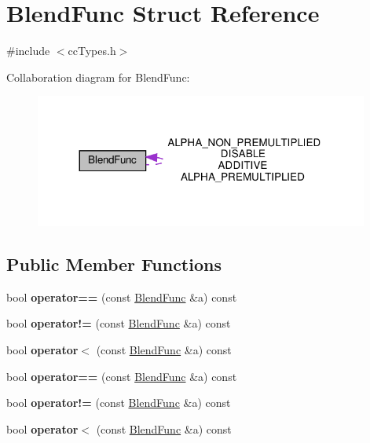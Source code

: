 \hypertarget{structBlendFunc}{}\section{Blend\+Func Struct Reference}
\label{structBlendFunc}


{\ttfamily \#include $<$cc\+Types.\+h$>$}



Collaboration diagram for Blend\+Func\+:
\nopagebreak
\begin{figure}[H]
\begin{center}
\leavevmode
\includegraphics[width=311pt]{structBlendFunc__coll__graph}
\end{center}
\end{figure}
\subsection*{Public Member Functions}
\begin{DoxyCompactItemize}
\item 
\mbox{\label{structBlendFunc_a28283d70b76c3903fd67b664270ec010}} 
bool {\bfseries operator==} (const \hyperlink{structBlendFunc}{Blend\+Func} \&a) const
\item 
\mbox{\label{structBlendFunc_a8999b228261f51a2a5f9f6505ac68e16}} 
bool {\bfseries operator!=} (const \hyperlink{structBlendFunc}{Blend\+Func} \&a) const
\item 
\mbox{\label{structBlendFunc_a72e7187da9c3399a20f7f0e26c7a1398}} 
bool {\bfseries operator$<$} (const \hyperlink{structBlendFunc}{Blend\+Func} \&a) const
\item 
\mbox{\label{structBlendFunc_a28283d70b76c3903fd67b664270ec010}} 
bool {\bfseries operator==} (const \hyperlink{structBlendFunc}{Blend\+Func} \&a) const
\item 
\mbox{\label{structBlendFunc_a8999b228261f51a2a5f9f6505ac68e16}} 
bool {\bfseries operator!=} (const \hyperlink{structBlendFunc}{Blend\+Func} \&a) const
\item 
\mbox{\label{structBlendFunc_a72e7187da9c3399a20f7f0e26c7a1398}} 
bool {\bfseries operator$<$} (const \hyperlink{structBlendFunc}{Blend\+Func} \&a) const
\end{DoxyCompactItemize}
